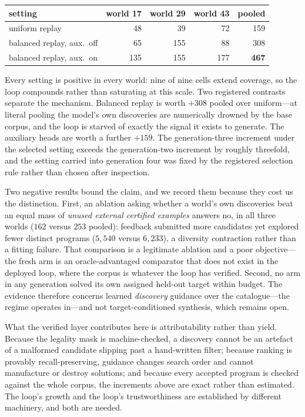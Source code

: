 \documentclass[11pt]{article}
\begin{document}
\begin{center}
\begin{tabular}{lrrrr}
\toprule
setting & world 17 & world 29 & world 43 & pooled \\
\midrule
uniform replay & 48 & 39 & 72 & 159 \\
balanced replay, aux.\ off & 65 & 155 & 88 & 308 \\
balanced replay, aux.\ on & 135 & 155 & 177 & \textbf{467} \\
\bottomrule
\end{tabular}
\end{center}

Every setting is positive in every world: nine of nine cells extend coverage, so the loop
compounds rather than saturating at this scale. Two registered contrasts separate the
mechanism. Balanced replay is worth $+308$ pooled over uniform---at literal pooling the
model's own discoveries are numerically drowned by the base corpus, and the loop is starved
of exactly the signal it exists to generate. The auxiliary heads are worth a further $+159$.
The generation-three increment under the selected setting exceeds the generation-two
increment by roughly threefold, and the setting carried into generation four was fixed by
the registered selection rule rather than chosen after inspection.

Two negative results bound the claim, and we record them because they cost us the
distinction. First, an ablation asking whether a world's own discoveries beat an equal mass
of \emph{unused external certified examples} answers no, in all three worlds
($162$ versus $253$ pooled): feedback submitted more candidates yet explored fewer distinct
programs ($5{,}540$ versus $6{,}233$), a diversity contraction rather than a fitting
failure. That comparison is a legitimate ablation and a poor objective---the fresh arm is an
oracle-advantaged comparator that does not exist in the deployed loop, where the corpus is
whatever the loop has verified. Second, no arm in any generation solved its own assigned
held-out target within budget. The evidence therefore concerns learned \emph{discovery}
guidance over the catalogue---the regime \cite{gauthier2023} operates in---and not
target-conditioned synthesis, which remains open.

What the verified layer contributes here is attributability rather than yield. Because the
legality mask is machine-checked, a discovery cannot be an artefact of a malformed
candidate slipping past a hand-written filter; because ranking is provably
recall-preserving, guidance changes search order and cannot manufacture or destroy
solutions; and because every accepted program is checked against the whole corpus, the
increments above are exact rather than estimated. The loop's growth and the loop's
trustworthiness are established by different machinery, and both are needed.
\end{document}

